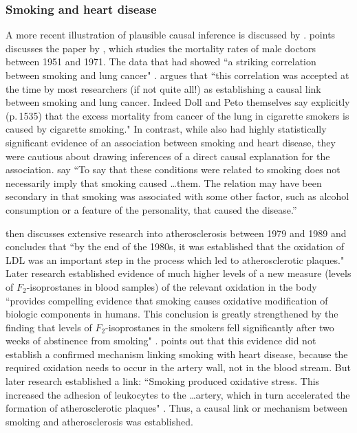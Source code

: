 \documentclass[11pt,reqno,titlepage]{amsart}
\begin{document}
\begin{doublespace}
\subsubsection{Smoking and heart disease}
A more recent illustration of plausible causal inference is discussed by \citet{Gillies2011-GILTRT-3}.
\citet{Gillies2011-GILTRT-3} points discusses the paper by \citet{Doll:1976aa}, which studies the mortality rates of male doctors between 1951 and 1971.
The data that \citet{Doll:1976aa} had showed ``a striking correlation between smoking and lung cancer" \citep[p.\,111]{Gillies2011-GILTRT-3}.
\citet{Gillies2011-GILTRT-3} argues that ``this correlation was accepted at the time by most researchers (if not quite all!) as establishing a causal link between smoking and lung cancer. Indeed Doll and Peto themselves say explicitly (p.\,1535) that the excess mortality from cancer of the lung in cigarette smokers is caused by cigarette smoking."
In contrast, while \citet{Doll:1976aa} also had highly statistically significant evidence of an association between smoking and heart disease, they were cautious about drawing inferences of a direct causal explanation for the association.
\citet[p.\,1528]{Doll:1976aa} say ``To say that these conditions were related to smoking does not necessarily imply that smoking caused \dots them. The relation may have been secondary in that smoking was associated with some other factor, such as alcohol consumption or a feature of the personality, that caused the disease.''
 
\citet{Gillies2011-GILTRT-3} then discusses extensive research into atherosclerosis between 1979 and 1989 and concludes that ``by the end of the 1980s, it was established that the oxidation of LDL was an important step in the process which led to atherosclerotic plaques."
Later research established evidence of much higher levels of a new measure (levels of $F_2$-isoprostanes in blood samples) of the relevant oxidation in the body ``provides compelling evidence that smoking causes oxidative modification of biologic components in humans. 
This conclusion is greatly strengthened by the finding that levels of $F_2$-isoprostanes in the smokers fell significantly after two weeks of abstinence from smoking" \citep[pp.\,1201--2]{Morrow:1995gz}.  
\citet[p.\,120]{Gillies2011-GILTRT-3} points out that this evidence did not establish a confirmed mechanism linking smoking with heart disease, because the required oxidation needs to occur in the artery wall, not in the blood stream. 
But later research established a link: ``Smoking produced oxidative stress. 
This increased the adhesion of leukocytes to the \dots artery, which in turn accelerated the formation of atherosclerotic plaques" \citep[p.\,123]{Gillies2011-GILTRT-3}.
Thus, a causal link or mechanism between smoking and atherosclerosis was established.


\end{doublespace}
\end{document}
